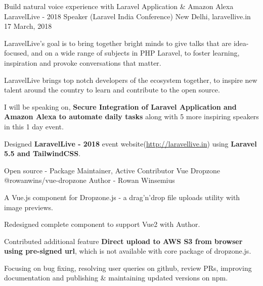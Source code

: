 

\begin{cventries}

  \cventry
    {Build natural voice experience with Laravel Application \& Amazon Alexa} %
    {LaravelLive - 2018 Speaker (Laravel India Conference)} %
    {New Delhi, laravellive.in} %
    {17 March, 2018} %
    {
      \begin{cvitems} %
        \item {LaravelLive's goal is to bring together bright minds to give talks that are idea-focused, and on a wide range of subjects in PHP Laravel, to foster learning, inspiration and provoke conversations that matter.}
        \item {LaravelLive brings top notch developers of the ecosystem together, to inspire new talent around the country to learn and contribute to the open source.}
        \item {I will be speaking on, \textbf{Secure Integration of Laravel Application and Amazon Alexa to automate daily tasks} along with 5 more inspiring speakers in this 1 day event.}
        \item {Designed \textbf{LaravelLive - 2018} event website(\href{http://laravellive.in}{http://laravellive.in}) using \textbf{Laravel 5.5 and TailwindCSS}.}
      \end{cvitems}
    }
  \cventry
    {Open source - Package Maintainer, Active Contributor} %
    {Vue Dropzone} %
    {@rowanwins/vue-dropzone} %
    {Author - Rowan Winsemius} %
    {
      \begin{cvitems} %
        \item {A Vue.js component for Dropzone.js - a drag’n’drop file uploads utility with image previews.}
        \item {Redesigned complete component to support Vue2 with Author.}
        \item {Contributed additional feature \textbf{Direct upload to AWS S3 from browser using pre-signed url}, which is not available with core package of dropzone.js.}
        \item {Focusing on bug fixing, resolving user queries on github, review PRs, improving documentation and publishing \& maintaining updated versions on npm.}
      \end{cvitems}
    }


\end{cventries}
